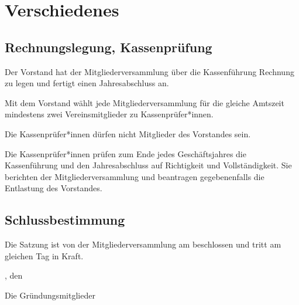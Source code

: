 \chapter{Verschiedenes}

\section{Rechnungslegung, Kassenprüfung}
\begin{absätze}
	\item Der Vorstand hat der Mitgliederversammlung über die Kassenführung Rechnung zu legen und fertigt einen Jahresabschluss an.
	\item Mit dem Vorstand wählt jede Mitgliederversammlung für die gleiche Amtszeit mindestens zwei Vereinsmitglieder zu Kassenprüfer*innen. 
	\item Die Kassenprüfer*innen dürfen nicht Mitglieder des Vorstandes sein. 
    \item Die Kassenprüfer*innen prüfen zum Ende jedes Geschäftsjahres die Kassenführung und den Jahresabschluss auf Richtigkeit und Vollständigkeit. Sie berichten der Mitgliederversammlung und beantragen gegebenenfalls die Entlastung des Vorstandes.
\end{absätze}

\section{Schlussbestimmung}
Die Satzung ist von der Mitgliederversammlung am \DatumSatzung{} beschlossen und tritt am gleichen Tag in Kraft.

\vfill %

\Stadt{}, den \DatumSatzung{}

Die Gründungsmitglieder
